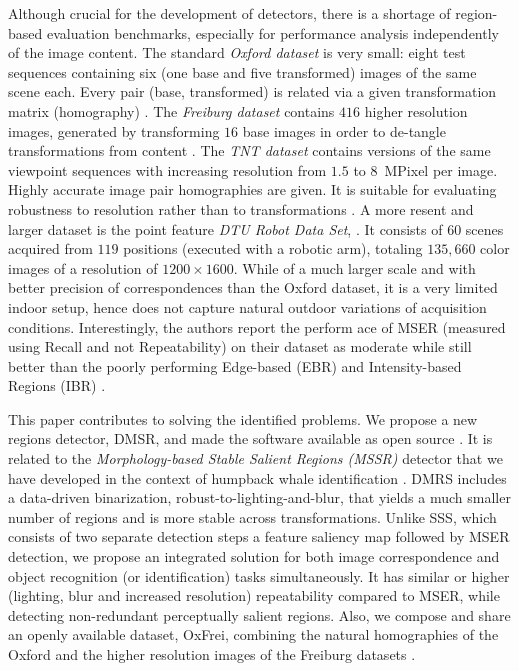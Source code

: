\documentclass[conference,compsoc]{IEEEtran}
\begin{document}
Although crucial for the development of detectors, there is a shortage of region-based evaluation benchmarks, especially for performance analysis independently of the image content.  The standard {\em Oxford dataset} is very small: eight test sequences containing six (one base and five transformed) images of the same scene each. Every pair (base, transformed) is related via a given transformation matrix (homography) \cite{Mikolajczyk:2005}.  The {\em Freiburg dataset} contains $416$ higher resolution images, generated by transforming $16$ base images in order to de-tangle transformations from content \cite{FischerDB14}.  
The {\em TNT dataset} contains versions of the same viewpoint sequences with increasing resolution from $1.5$ to $8$~MPixel per image. Highly accurate image pair homographies are given. It is suitable for evaluating robustness to resolution rather than to transformations \cite{CorRos2013}.  A more resent and larger dataset is the point feature {\em DTU Robot Data Set}, \cite{AanaesDP12}. It  consists of $60$ scenes acquired from $119$ positions (executed with a robotic arm), totaling $135, 660$ color images of a resolution of $1200 \times 1600$. While of a much larger scale and with better precision of correspondences than the Oxford dataset, it is a very limited indoor setup, hence does not capture natural outdoor variations of acquisition conditions. Interestingly, the authors report the perform ace of MSER (measured using Recall and not Repeatability) on their dataset as moderate while still better than the poorly performing Edge-based (EBR) and Intensity-based Regions (IBR) \cite{Tuytelaars:2004}. 

This paper contributes to solving the identified problems. We propose a new regions detector, DMSR, and made the software available as open source \cite{elena_ranguelova_2016_45156}. It is related to the {\em Morphology-based Stable Salient Regions (MSSR)} detector that we have developed in the context of humpback whale identification \cite{RangMSSR06, RangHumpb06}. DMRS includes a data-driven binarization, robust-to-lighting-and-blur, that yields a much smaller number of regions and is more stable across transformations. Unlike SSS, which consists of two separate detection steps a feature saliency map followed by MSER detection, we propose an integrated solution for both image correspondence and object recognition (or identification) tasks simultaneously. It has similar or higher (lighting, blur and increased resolution) repeatability compared to MSER, while detecting non-redundant perceptually salient regions.%
Also, we compose and share an openly available dataset, OxFrei, combining the natural homographies of the Oxford and the higher resolution images of the Freiburg datasets \cite{elena_ranguelova_2016_45156}.
\end{document}
